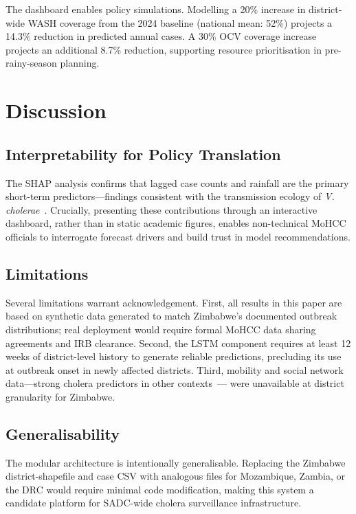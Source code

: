 \documentclass[conference]{IEEEtran}
\begin{document}
The dashboard enables policy simulations. Modelling a 20\% increase in
district-wide WASH coverage from the 2024 baseline (national mean: 52\%)
projects a 14.3\% reduction in predicted annual cases. A 30\% OCV coverage
increase projects an additional 8.7\% reduction, supporting resource
prioritisation in pre-rainy-season planning.


\section{Discussion}
\label{sec:discussion}

\subsection{Interpretability for Policy Translation}

The SHAP analysis confirms that lagged case counts and rainfall are the primary
short-term predictors—findings consistent with the transmission ecology of
\textit{V. cholerae}~\cite{colwell2002global}. Crucially, presenting these
contributions through an interactive dashboard, rather than in static academic
figures, enables non-technical MoHCC officials to interrogate forecast drivers
and build trust in model recommendations.

\subsection{Limitations}

Several limitations warrant acknowledgement. First, all results in this paper
are based on synthetic data generated to match Zimbabwe's documented outbreak
distributions; real deployment would require formal MoHCC data sharing
agreements and IRB clearance. Second, the LSTM component requires at least 12
weeks of district-level history to generate reliable predictions, precluding
its use at outbreak onset in newly affected districts. Third, mobility and
social network data—strong cholera predictors in other contexts~\cite{gatto2013spread}—
were unavailable at district granularity for Zimbabwe.

\subsection{Generalisability}

The modular architecture is intentionally generalisable. Replacing the Zimbabwe
district-shapefile and case CSV with analogous files for Mozambique, Zambia,
or the DRC would require minimal code modification, making this system a
candidate platform for SADC-wide cholera surveillance infrastructure.
\end{document}
